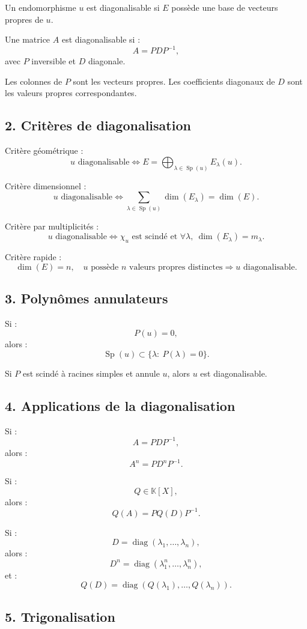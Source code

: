 \documentclass[11pt,a4paper]{article}
\newcommand{\K}{\mathbb K}
\newcommand{\Sp}{\operatorname{Sp}}
\newcommand{\diag}{\operatorname{diag}}
\begin{document}
Un endomorphisme \(u\) est diagonalisable si \(E\) possède une base de vecteurs propres de \(u\).

Une matrice \(A\) est diagonalisable si :
\[
A=PDP^{-1},
\]
avec \(P\) inversible et \(D\) diagonale.

Les colonnes de \(P\) sont les vecteurs propres.  
Les coefficients diagonaux de \(D\) sont les valeurs propres correspondantes.

\subsection*{2. Critères de diagonalisation}

Critère géométrique :
\[
u\text{ diagonalisable}
\Longleftrightarrow
E=\bigoplus_{\lambda\in\Sp(u)}E_\lambda(u).
\]

Critère dimensionnel :
\[
u\text{ diagonalisable}
\Longleftrightarrow
\sum_{\lambda\in\Sp(u)}\dim(E_\lambda)=\dim(E).
\]

Critère par multiplicités :
\[
u\text{ diagonalisable}
\Longleftrightarrow
\chi_u\text{ est scindé et }\forall\lambda,\ \dim(E_\lambda)=m_\lambda.
\]

Critère rapide :
\[
\dim(E)=n,\quad u\text{ possède }n\text{ valeurs propres distinctes}
\Longrightarrow
u\text{ diagonalisable}.
\]

\subsection*{3. Polynômes annulateurs}

Si :
\[
P(u)=0,
\]
alors :
\[
\Sp(u)\subset\{\lambda:\ P(\lambda)=0\}.
\]

Si \(P\) est scindé à racines simples et annule \(u\), alors \(u\) est diagonalisable.

\subsection*{4. Applications de la diagonalisation}

Si :
\[
A=PDP^{-1},
\]
alors :
\[
A^n=PD^nP^{-1}.
\]

Si :
\[
Q\in\K[X],
\]
alors :
\[
Q(A)=PQ(D)P^{-1}.
\]

Si :
\[
D=\diag(\lambda_1,\dots,\lambda_n),
\]
alors :
\[
D^n=\diag(\lambda_1^n,\dots,\lambda_n^n),
\]
et :
\[
Q(D)=\diag(Q(\lambda_1),\dots,Q(\lambda_n)).
\]

\subsection*{5. Trigonalisation}
\end{document}
